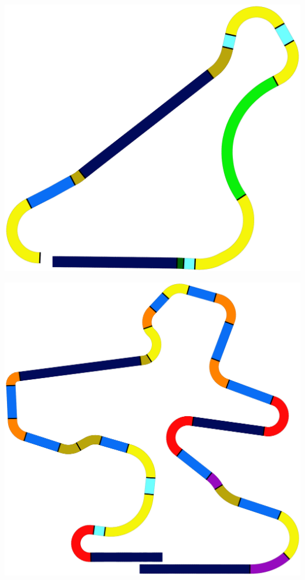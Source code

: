 \documentclass[portrait,a0paper,fontscale=0.292]{baposter}
\begin{document}
\begin{poster}
{\begin{minipage}{\textwidth}
\begin{minipage}{0.25\textwidth}
            \label{fig:e-track-6}
        \end{minipage}
        \begin{minipage}{0.15\textwidth}
            \centering
            \includegraphics[width=\textwidth]{g-track-1}
            \label{fig:g-track-1}
        \end{minipage}
        \textwidth
        \begin{minipage}{0.16\textwidth}
            \centering
            \includegraphics[width=\textwidth]{alpine-2}
            \label{fig:alpine-2}
        \end{minipage}
        \label{fig:clusters}
    \end{minipage}
}

\end{poster}
\end{document}
